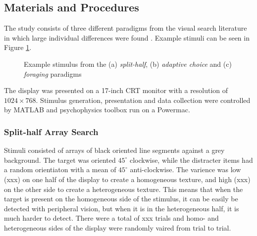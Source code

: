 \documentclass[]{rsos}%
\begin{document}
\subsection{Materials and Procedures}

The study consists of three different paradigms from the visual search literature in which large individual differences were found \cite{nowakowsak2017, irons-leber2016, kristjansson2014}. Example stimuli can be seen in Figure \ref{fig:exampleStimuli}.

\begin{figure}
\centering
{}
\caption{Example stimulus from the (a) \textit{split-half}, (b) \textit{adaptive choice} and (c) \textit{foraging} paradigms}
\label{fig:exampleStimuli}
\end{figure}

The display was presented on a 17-inch CRT monitor with a resolution of $1024 \times 
768$. Stimulus generation, presentation and data collection were controlled by MATLAB and psychophysics toolbox \cite{brainard1997} run on a Powermac. 

\subsubsection{Split-half Array Search}

Stimuli consisted of arrays of black oriented line segments against a grey background. The target was oriented $45^{\circ}$ clockwise, while the distracter items had a random orientiaton with a mean of $45^{\circ}$ anti-clockwise. The varience was low (xxx) on one half of the display to create a homogeneous texture, and high (xxx) on the other side to create a heterogeneous texture. This means that when the target is present on the homogeneous side of the stimulus, it can be easily be detected with peripheral vision, but when it is in the heterogeneous half, it is much harder to detect. There were a total of xxx trials and homo- and heterogeneous sides of the display were randomly vaired from trial to trial.
 
\end{document}
